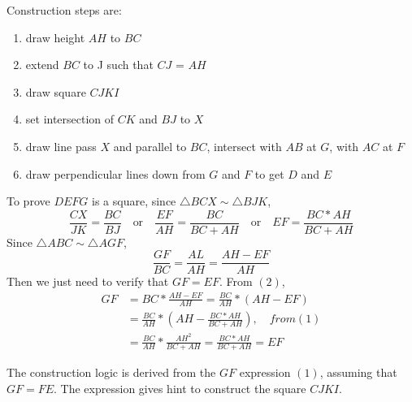 \documentclass[12pt]{exercise}
\begin{document}
	Construction steps are:
	\begin{enumerate}[topsep=0pt,itemsep=-1ex,partopsep=1ex,parsep=1ex]
		\item draw height $AH$ to $BC$
		\item extend $BC$ to J such that $CJ$ = $AH$
		\item draw square $CJKI$
		\item set intersection of $CK$ and $BJ$ to $X$
		\item draw line pass $X$ and parallel to $BC$, intersect with $AB$ at $G$, with $AC$ at $F$
		\item draw perpendicular lines down from $G$ and $F$ to get $D$ and $E$
	\end{enumerate}

	To prove $DEFG$ is a square, since $\triangle BCX \sim \triangle BJK$,
	\begin{equation}
		\frac{CX}{JK} = \frac{BC}{BJ}
		\quad \textrm{or} \quad \frac{EF}{AH} = \frac{BC}{BC + AH}
		\quad \textrm{or} \quad EF = \frac{BC * AH}{BC + AH}
	\end{equation}
	Since $\triangle ABC \sim \triangle AGF$,
	\begin{equation}
		\frac{GF}{BC} = \frac{AL}{AH} = \frac{AH - EF}{AH}
	\end{equation}
	Then we just need to verify that $GF = EF$. From $(2)$,
	\begin{equation}
		\begin{aligned}
		GF &= BC * \frac{AH - EF}{AH} = \frac{BC}{AH} *(AH - EF)\\
		   &= \frac{BC}{AH} * (AH - \frac{BC * AH}{BC + AH}), \quad from (1)\\
		   &= \frac{BC}{AH} * \frac{AH^2}{BC + AH} = \frac{BC * AH}{BC + AH} = EF
		\end{aligned}
	\end{equation}

	The construction logic is derived from the $GF$ expression $(1)$, assuming that $ GF = FE$.
	The expression gives hint to construct the square $CJKI$.
\end{document}
